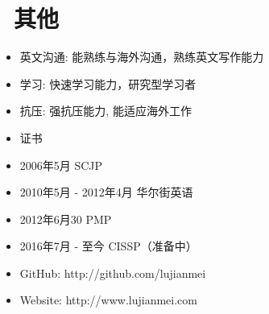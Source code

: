 \documentclass{resume}
\begin{document}
\section{\faInfo\ 其他}
  \begin{itemize}[parsep=0.5ex]
    \item 英文沟通: 能熟练与海外沟通，熟练英文写作能力
    \item 学习: 快速学习能力，研究型学习者
    \item 抗压: 强抗压能力, 能适应海外工作
    \item 证书
      \item 2006年5月    SCJP
      \item 2010年5月 - 2012年4月 华尔街英语
      \item 2012年6月30  PMP
      \item 2016年7月 - 至今    CISSP（准备中）
    \item GitHub: http://github.com/lujianmei
    \item Website: http://www.lujianmei.com
    \end{itemize}

%
%
\end{document}

